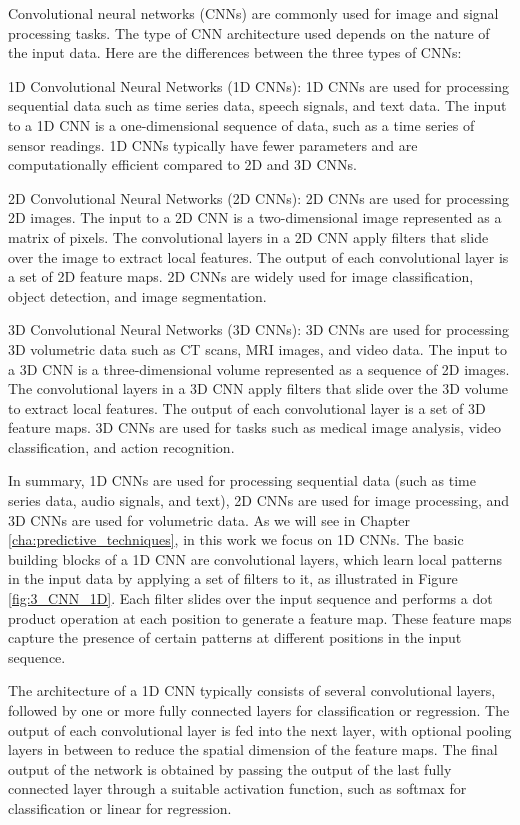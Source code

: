 Convolutional neural networks (CNNs) are commonly used for image and signal processing tasks. The type of CNN architecture used depends on the nature of the input data. Here are the differences between the three types of CNNs:

1D Convolutional Neural Networks (1D CNNs): 1D CNNs are used for processing sequential data such as time series data, speech signals, and text data. The input to a 1D CNN is a one-dimensional sequence of data, such as a time series of sensor readings. 1D CNNs typically have fewer parameters and are computationally efficient compared to 2D and 3D CNNs.

2D Convolutional Neural Networks (2D CNNs): 2D CNNs are used for processing 2D images. The input to a 2D CNN is a two-dimensional image represented as a matrix of pixels. The convolutional layers in a 2D CNN apply filters that slide over the image to extract local features. The output of each convolutional layer is a set of 2D feature maps. 2D CNNs are widely used for image classification, object detection, and image segmentation.

3D Convolutional Neural Networks (3D CNNs): 3D CNNs are used for processing 3D volumetric data such as CT scans, MRI images, and video data. The input to a 3D CNN is a three-dimensional volume represented as a sequence of 2D images. The convolutional layers in a 3D CNN apply filters that slide over the 3D volume to extract local features. The output of each convolutional layer is a set of 3D feature maps. 3D CNNs are used for tasks such as medical image analysis, video classification, and action recognition.

In summary, 1D CNNs are used for processing sequential data (such as time series data, audio signals, and text), 2D CNNs are used for image processing, and 3D CNNs are used for volumetric data. As we will see in Chapter \ref{cha:predictive_techniques}, in this work we focus on 1D CNNs. The basic building blocks of a 1D CNN are convolutional layers, which learn local patterns in the input data by applying a set of filters to it, as illustrated in Figure \ref{fig:3_CNN_1D}. Each filter slides over the input sequence and performs a dot product operation at each position to generate a feature map. These feature maps capture the presence of certain patterns at different positions in the input sequence. 
 
The architecture of a 1D CNN typically consists of several convolutional layers, followed by one or more fully connected layers for classification or regression. The output of each convolutional layer is fed into the next layer, with optional pooling layers in between to reduce the spatial dimension of the feature maps. The final output of the network is obtained by passing the output of the last fully connected layer through a suitable activation function, such as softmax for classification or linear for regression.
 
